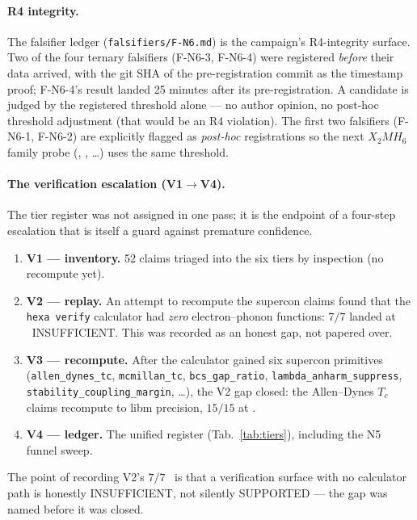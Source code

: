\paragraph{R4 integrity.}
The falsifier ledger (\texttt{falsifiers/F-N6.md}) is the campaign's
R4-integrity surface. Two of the four ternary falsifiers (F-N6-3, F-N6-4)
were registered \emph{before} their data arrived, with the git SHA of the
pre-registration commit as the timestamp proof; F-N6-4's result landed 25
minutes after its pre-registration. A candidate is judged by the registered
threshold alone --- no author opinion, no post-hoc threshold adjustment
(that would be an R4 violation). The first two falsifiers (F-N6-1, F-N6-2)
are explicitly flagged as \emph{post-hoc} registrations so the next
$X_2MH_6$ family probe (, , \dots) uses the same
threshold.

\paragraph{The verification escalation (V1$\to$V4).}
The tier register was not assigned in one pass; it is the endpoint of a
four-step escalation that is itself a guard against premature confidence.
\begin{enumerate}\itemsep0.2em
\item \textbf{V1 --- inventory.} 52 claims triaged into the six tiers by
  inspection (no recompute yet).
\item \textbf{V2 --- replay.} An attempt to recompute the supercon claims
  found that the \texttt{hexa verify} calculator had \emph{zero}
  electron--phonon functions: $7/7$ landed at \tierOrange\ INSUFFICIENT. This
  was recorded as an honest gap, not papered over.
\item \textbf{V3 --- recompute.} After the calculator gained six supercon
  primitives (\texttt{allen\_dynes\_tc}, \texttt{mcmillan\_tc},
  \texttt{bcs\_gap\_ratio}, \texttt{lambda\_anharm\_suppress},
  \texttt{stability\_coupling\_margin}, \dots), the V2 gap closed: the
  Allen--Dynes $T_c$ claims recompute to libm precision, $15/15$ at
  \tierGreen.
\item \textbf{V4 --- ledger.} The unified register (Tab.~\ref{tab:tiers}),
  including the N5 funnel sweep.
\end{enumerate}
The point of recording V2's $7/7$ \tierOrange\ is that a verification surface
with no calculator path is honestly INSUFFICIENT, not silently SUPPORTED ---
the gap was named before it was closed.

